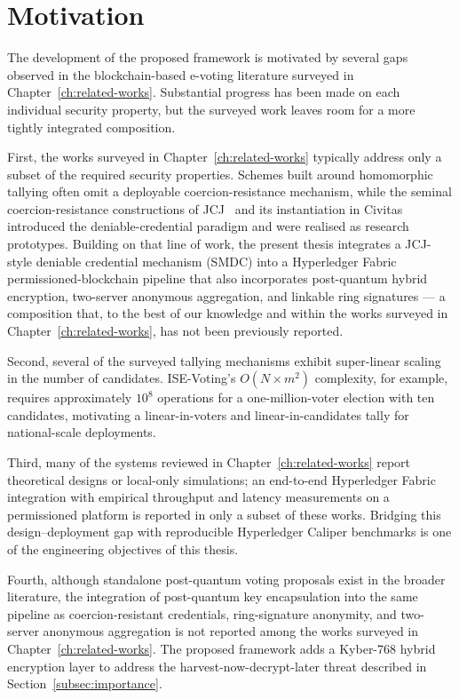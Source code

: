 \section{Motivation}
\label{sec:motivation}

The development of the proposed framework is motivated by several gaps observed in the blockchain-based e-voting literature surveyed in Chapter~\ref{ch:related-works}. Substantial progress has been made on each individual security property, but the surveyed work leaves room for a more tightly integrated composition.

First, the works surveyed in Chapter~\ref{ch:related-works} typically address only a subset of the required security properties. Schemes built around homomorphic tallying often omit a deployable coercion-resistance mechanism, while the seminal coercion-resistance constructions of JCJ~\cite{jcj2005} and its instantiation in Civitas~\cite{civitas2008} introduced the deniable-credential paradigm and were realised as research prototypes. Building on that line of work, the present thesis integrates a JCJ-style deniable credential mechanism (SMDC) into a Hyperledger Fabric permissioned-blockchain pipeline that also incorporates post-quantum hybrid encryption, two-server anonymous aggregation, and linkable ring signatures --- a composition that, to the best of our knowledge and within the works surveyed in Chapter~\ref{ch:related-works}, has not been previously reported.

Second, several of the surveyed tallying mechanisms exhibit super-linear scaling in the number of candidates. ISE-Voting's $O(N \times m^2)$ complexity, for example, requires approximately $10^8$ operations for a one-million-voter election with ten candidates, motivating a linear-in-voters and linear-in-candidates tally for national-scale deployments.

Third, many of the systems reviewed in Chapter~\ref{ch:related-works} report theoretical designs or local-only simulations; an end-to-end Hyperledger Fabric integration with empirical throughput and latency measurements on a permissioned platform is reported in only a subset of these works. Bridging this design--deployment gap with reproducible Hyperledger Caliper benchmarks is one of the engineering objectives of this thesis.

Fourth, although standalone post-quantum voting proposals exist in the broader literature, the integration of post-quantum key encapsulation into the same pipeline as coercion-resistant credentials, ring-signature anonymity, and two-server anonymous aggregation is not reported among the works surveyed in Chapter~\ref{ch:related-works}. The proposed framework adds a Kyber-768 hybrid encryption layer to address the harvest-now-decrypt-later threat described in Section~\ref{subsec:importance}.

